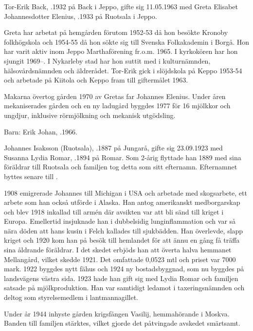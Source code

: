 Tor-Erik Back, .1932 på Back i Jeppo, gifte sig 11.05.1963 med Greta Elisabet Johannesdotter Elenius, .1933 på Ruotsala i Jeppo.

Greta har arbetat på hemgården förutom 1952-53 då hon besökte Kronoby folkhögskola och 1954-55 då hon sökte sig till  Svenska Folkakademin i Borgå. Hon har varit aktiv  inom Jeppo Marthaförening fr.o.m. 1965. I kyrkokören har hon sjungit 1969--. I Nykarleby stad har hon suttit med i kulturnämnden, hälsovårdsnämnden och äldrerådet. Tor-Erik gick i slöjdskola på Keppo 1953-54 och arbetade på Kiitola och Keppo fram till giftermålet 1963.

Makarna övertog gården 1970 av Gretas far Johannes Elenius. Under åren mekaniserades gården och en ny ladugård byggdes 1977 för 16 mjölkkor och ungdjur, inklusive rörmjölkning och mekanisk utgödsling.

Barn:  Erik Johan, .1966.


Johannes Isaksson (Ruotsala), .1887 på Jungarå, gifte sig 23.09.1923 med Susanna Lydia Romar, .1894 på Romar. Som 2-årig flyttade han 1889 med sina föräldrar till Ruotsala och familjen tog detta som sitt efternamn. Efternamnet byttes senare till .

1908 emigrerade Johannes till Michigan i USA och arbetade med skogsarbete, ett arbete som han också utförde i Alaska. Han antog amerikanskt medborgarskap och blev 1918 inkallad till armén där avsikten var att bli sänd till kriget i Europa. Emellertid insjuknade han i dubbelsidig lunginflammation och var så nära döden att hans kusin i Felch kallades till sjukbädden. Han överlevde, slapp kriget och 1920 kom han på besök till hemlandet för att ännu en gång få träffa sina åldrande föräldrar. I det skedet erbjöds han att överta halva hemmanet Mellangård, vilket skedde 1921. Det omfattade 0,0523 mtl och priset var 7000 mark. 1922 byggdes nytt fähus och 1924 ny bostadsbyggnad, som nu byggdes på landsvägens västra sida. 1923 hade han gift sig med Lydia Romar och familjen satsade på mjölkproduktion. Han var samtidigt ledamot i taxeringsnämnden och deltog som styrelsemedlem i lantmannagillet.

Under år 1944 inhyste gården krigsfången Vasilij, hemmahörande i Moskva. Banden till familjen stärktes, vilket gjorde det påtvingade avskedet smärtsamt.

